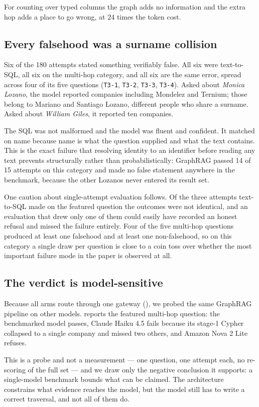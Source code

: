 For counting over typed columns the graph adds no information and the extra hop
adds a place to go wrong, at 24 times the token cost.

\subsection{Every falsehood was a surname collision}

Six of the 180 attempts stated something verifiably false. All six were
text-to-SQL, all six on the multi-hop category, and all six are the same error,
spread across four of its five questions (\texttt{T3-1}, \texttt{T3-2}, \texttt{T3-3}, \texttt{T3-4}). Asked about \emph{Monica Lozano},
the model reported companies including Mondelez and Ternium; those belong to
Mariano and Santiago Lozano, different people who share a surname. Asked about
\emph{William Giles}, it reported ten companies.

The SQL was not malformed and the model was fluent and confident. It matched on
name because name is what the question supplied and what the text contains. This
is the exact failure that resolving identity to an identifier before reading any
text prevents structurally rather than probabilistically: GraphRAG passed 14 of
15 attempts on this category and made no false statement anywhere in the
benchmark, because the other Lozanos never entered its result set.

One caution about single-attempt evaluation follows. Of the three attempts
text-to-SQL made on the featured question the outcomes were not identical, and an
evaluation that drew only one of them could easily have recorded an honest
refusal and missed the failure entirely. Four of the five multi-hop questions
produced at least one falsehood and at least one non-falsehood, so on this
category a single draw per question is close to a coin toss over whether the most
important failure mode in the paper is observed at all.

\subsection{The verdict is model-sensitive}

Because all arms route through one gateway (), we probed the same
GraphRAG pipeline on other models.  reports the featured
multi-hop question: the benchmarked model passes, Claude Haiku 4.5 fails because
its stage-1 Cypher collapsed to a single company and missed two others, and Amazon
Nova 2 Lite refuses.

This is a probe and not a measurement --- one question, one attempt each, no
re-scoring of the full set --- and we draw only the negative conclusion it
supports: a single-model benchmark bounds what can be claimed. The architecture
constrains what evidence reaches the model, but the model still has to write a
correct traversal, and not all of them do.
